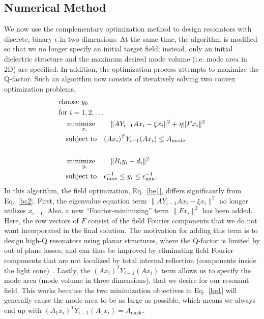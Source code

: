 \subsection{Numerical Method}\label{sec:2Dnum}
We now use the complementary optimization method to design resonators with discrete, binary $\epsilon$ in two dimensions. At the same time, the algorithm is modified so that we no longer specify an initial target field; instead, only an initial dielectric structure and the maximum desired mode volume (i.e. mode area in 2D) are specified. In addition, the optimization process attempts to maximize the Q-factor. Such an algorithm now consists of iteratively solving two convex optimization problems,
\begin{align}
&\text{choose $y_0$} \nonumber \\
&\text{for } i = 1, 2, \ldots \nonumber \\
&\quad\operatorname*{\text{minimize}\quad}_{x_i}\quad \|A Y_{i-1} A x_i - \xi x_{i}\|^2 +   \eta \|F x_i\|^2\nonumber \\
&\quad\text{subject to}\quad (A x_i)^T Y_{i-1} (A x_i) \leq A_\text{mode} \label{be1} \\
\nonumber \\
&\quad\operatorname*{\text{minimize}\quad}_{y_i}\quad \|B_i y_i-d_i\|^2 \nonumber \\
&\quad\text{subject to}\quad \epsilon_\text{max}^{-1} \leq y_i \leq \epsilon_\text{min}^{-1}. \label{be2} 
\end{align}
In this algorithm, the field optimization, Eq.~\eqref{be1}, differs significantly from Eq.~\eqref{bc2}. First, the eigenvalue equation term $\|A Y_{i-1} A x_i - \xi x_{i}\|^2$ no longer utilizes $x_{i-1}$. Also, a new ``Fourier-minimizing'' term $\|F x_i\|^2$ has been added. Here, the row vectors of $F$ consist of the field Fourier components that we do not want incorporated in the final solution. The motivation for adding this term is to design high-Q resonators using planar structures, where the Q-factor is limited by out-of-plane losses, and can thus be improved by eliminating field Fourier components that are not localized by total internal reflection (components inside the light cone)~\cite{Vuc05}. Lastly, the $(A x_i)^T Y_{i-1} (A x_i)$ term allows us to specify the mode area (mode volume in three dimensions), that we desire for our resonant field. This works because the two minimization objectives in Eq.~\eqref{be1} will generally cause the mode area to be as large as possible, which means we always end up with $(A_1 x_i)^T Y_{i-1} (A_1 x_i) = A_\text{mode}$.

